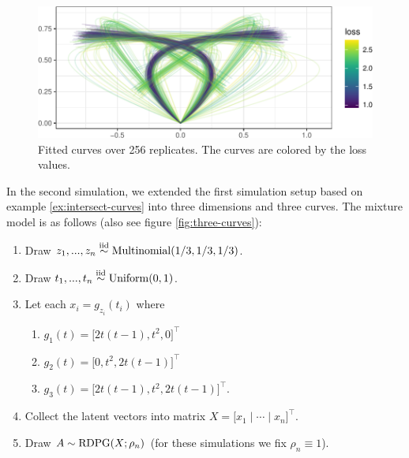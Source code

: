 \documentclass[
  12pt,
]{article}
\providecommand{\tightlist}{%
  \setlength{\itemsep}{0pt}\setlength{\parskip}{0pt}}
\theoremstyle{definition}
\theoremstyle{definition}
\theoremstyle{definition}
\theoremstyle{definition}
\theoremstyle{remark}
\begin{document}
\begin{figure}[H]

{\centering \includegraphics{draft_files/figure-latex/repeat-curves-1} 

}

\caption{Fitted curves over 256 replicates. The curves are colored by the loss values.}\label{fig:repeat-curves}
\end{figure}

In the second simulation, we extended the first simulation setup based on example \ref{ex:intersect-curves} into three dimensions and three curves.
The mixture model is as follows (also see figure \ref{fig:three-curves}):

\begin{enumerate}
\def\labelenumi{\arabic{enumi}.}
\tightlist
\item
  Draw \(z_1, ..., z_n \stackrel{\mathrm{iid}}{\sim} \mathrm{Multinomial}(1/3, 1/3, 1/3)\).
\item
  Draw \(t_1, ..., t_n \stackrel{\mathrm{iid}}{\sim} \mathrm{Uniform}(0, 1)\).
\item
  Let each \(x_i = g_{z_i}(t_i)\) where

  \begin{enumerate}
  \def\labelenumii{\roman{enumii}.}
  \tightlist
  \item
    \(g_1(t) = \Big[ 2 t (t-1), t^2, 0 \Big]^\top\)
  \item
    \(g_2(t) = \Big[ 0, t^2, 2 t (t-1) \Big]^\top\)
  \item
    \(g_3(t) = \Big[2 t (t-1), t^2, 2 t (t-1) \Big]^\top\).
  \end{enumerate}
\item
  Collect the latent vectors into matrix \(X = \Big[ x_1 \mid \cdots \mid x_n \Big]^\top\).
\item
  Draw \(A \sim \mathrm{RDPG}(X; \rho_n)\) (for these simulations we fix \(\rho_n \equiv 1\)).
\end{enumerate}
\end{document}
